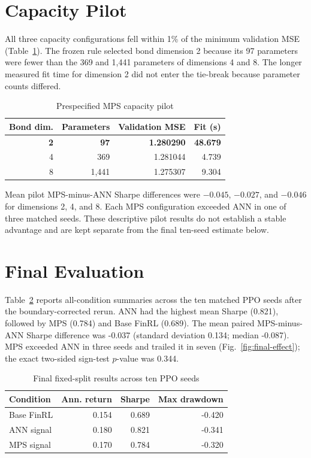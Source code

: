 \documentclass[conference]{IEEEtran}
\begin{document}
\section{Capacity Pilot}

All three capacity configurations fell within 1\% of the minimum validation
MSE (Table~\ref{tab:capacity}). The frozen rule selected bond dimension 2
because its 97 parameters were fewer than the 369 and 1,441 parameters of
dimensions 4 and 8. The longer measured fit time for dimension 2 did not enter
the tie-break because parameter counts differed.

\begin{table}[t]
\caption{Prespecified MPS capacity pilot}
\label{tab:capacity}
\centering
\small
\begin{tabular}{rrrr}
\toprule
Bond dim. & Parameters & Validation MSE & Fit (s) \\
\midrule
\textbf{2} & \textbf{97} & \textbf{1.280290} & \textbf{48.679} \\
4 & 369 & 1.281044 & 4.739 \\
8 & 1,441 & 1.275307 & 9.304 \\
\bottomrule
\end{tabular}
\end{table}

Mean pilot MPS-minus-ANN Sharpe differences were \(-0.045\), \(-0.027\), and
\(-0.046\) for dimensions 2, 4, and 8. Each MPS configuration exceeded ANN in
one of three matched seeds. These descriptive pilot results do not establish a
stable advantage and are kept separate from the final ten-seed estimate below.

\section{Final Evaluation}

Table~\ref{tab:final} reports all-condition summaries across the ten matched
PPO seeds after the boundary-corrected rerun. ANN had the highest mean Sharpe
(0.821), followed by MPS (0.784) and Base FinRL (0.689). The mean paired
MPS-minus-ANN Sharpe difference was -0.037 (standard deviation 0.134; median
-0.087). MPS exceeded ANN in three seeds and trailed it in seven
(Fig.~\ref{fig:final-effect}); the exact two-sided sign-test \(p\)-value was
0.344.

\begin{table}[t]
\caption{Final fixed-split results across ten PPO seeds}
\label{tab:final}
\centering
\small
\begin{tabular}{lrrr}
\toprule
Condition & Ann. return & Sharpe & Max drawdown \\
\midrule
Base FinRL & 0.154 & 0.689 & -0.420 \\
ANN signal & 0.180 & 0.821 & -0.341 \\
MPS signal & 0.170 & 0.784 & -0.320 \\
\bottomrule
\end{tabular}
\end{table}
\end{document}

